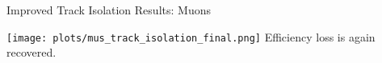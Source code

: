 \documentclass{beamer}
\begin{document}
\begin{frame}{Improved Track Isolation Results: Muons}%
  
  \begin{center}
    
    
    \vspace{-0.2cm}
    
    \texttt{[image: plots/mus\_track\_isolation\_final.png]}
    \vspace{-0.1cm}
    Efficiency loss is again recovered.
  \end{center}
\end{frame}
\end{document}
